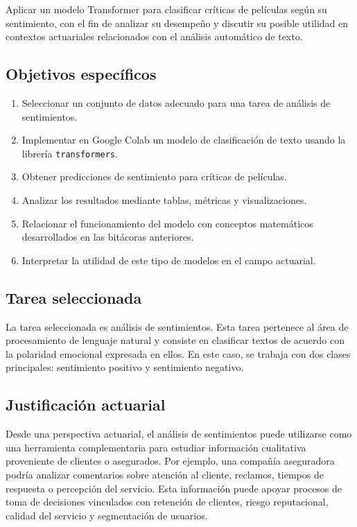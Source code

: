 \documentclass[11pt,letterpaper]{article}
\begin{document}
	Aplicar un modelo Transformer para clasificar críticas de películas según su sentimiento, con el fin de analizar su desempeño y discutir su posible utilidad en contextos actuariales relacionados con el análisis automático de texto.
	
	\subsection{Objetivos específicos}
	
	\begin{enumerate}
		\item Seleccionar un conjunto de datos adecuado para una tarea de análisis de sentimientos.
		\item Implementar en Google Colab un modelo de clasificación de texto usando la librería \texttt{transformers}.
		\item Obtener predicciones de sentimiento para críticas de películas.
		\item Analizar los resultados mediante tablas, métricas y visualizaciones.
		\item Relacionar el funcionamiento del modelo con conceptos matemáticos desarrollados en las bitácoras anteriores.
		\item Interpretar la utilidad de este tipo de modelos en el campo actuarial.
	\end{enumerate}
	
	\subsection{Tarea seleccionada}
	
	La tarea seleccionada es análisis de sentimientos. Esta tarea pertenece al área de procesamiento de lenguaje natural y consiste en clasificar textos de acuerdo con la polaridad emocional expresada en ellos. En este caso, se trabaja con dos clases principales: sentimiento positivo y sentimiento negativo.
	
	\subsection{Justificación actuarial}
	
	Desde una perspectiva actuarial, el análisis de sentimientos puede utilizarse como una herramienta complementaria para estudiar información cualitativa proveniente de clientes o asegurados. Por ejemplo, una compañía aseguradora podría analizar comentarios sobre atención al cliente, reclamos, tiempos de respuesta o percepción del servicio. Esta información puede apoyar procesos de toma de decisiones vinculados con retención de clientes, riesgo reputacional, calidad del servicio y segmentación de usuarios.
	
\end{document}
